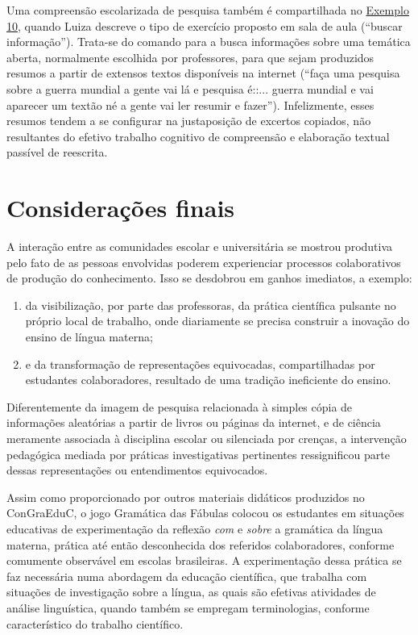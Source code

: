 

Uma compreensão escolarizada de pesquisa também é compartilhada no
\hyperref[tab-11]{Exemplo 10}, quando Luiza descreve o tipo de exercício proposto em sala
de aula (``buscar informação''). Trata-se do comando para a busca
informações sobre uma temática aberta, normalmente escolhida por
professores, para que sejam produzidos resumos a partir de extensos
textos disponíveis na internet (``faça uma pesquisa sobre a guerra
mundial a gente vai lá e pesquisa é::... guerra mundial e vai aparecer
um textão né a gente vai ler resumir e fazer''). Infelizmente, esses
resumos tendem a se configurar na justaposição de excertos copiados, não
resultantes do efetivo trabalho cognitivo de compreensão e elaboração
textual passível de reescrita.

\section{Considerações finais}\label{sec-consideraçõesfinais}

A interação entre as comunidades escolar e universitária se mostrou
produtiva pelo fato de as pessoas envolvidas poderem experienciar
processos colaborativos de produção do conhecimento. Isso se desdobrou
em ganhos imediatos, a exemplo:
\begin{enumerate}[label=\alph*)]
\item da visibilização, por parte das
professoras, da prática científica pulsante no próprio local de
trabalho, onde diariamente se precisa construir a inovação do ensino de
língua materna; \item e da transformação de representações equivocadas,
compartilhadas por estudantes colaboradores, resultado de uma tradição
ineficiente do ensino.
\end{enumerate}
 Diferentemente da imagem de pesquisa relacionada
à simples cópia de informações aleatórias a partir de livros ou páginas
da internet, e de ciência meramente associada à disciplina escolar ou
silenciada por crenças, a intervenção pedagógica mediada por práticas
investigativas pertinentes ressignificou parte dessas representações ou
entendimentos equivocados.

Assim como proporcionado por outros materiais didáticos produzidos no
ConGraEduC, o jogo Gramática das Fábulas colocou os estudantes em
situações educativas de experimentação da reflexão \emph{com} e
\emph{sobre} a gramática da língua materna, prática até então
desconhecida dos referidos colaboradores, conforme comumente observável
em escolas brasileiras. A experimentação dessa prática se faz necessária
numa abordagem da educação científica, que trabalha com situações de
investigação sobre a língua, as quais são efetivas atividades de análise
linguística, quando também se empregam terminologias, conforme
característico do trabalho científico.

